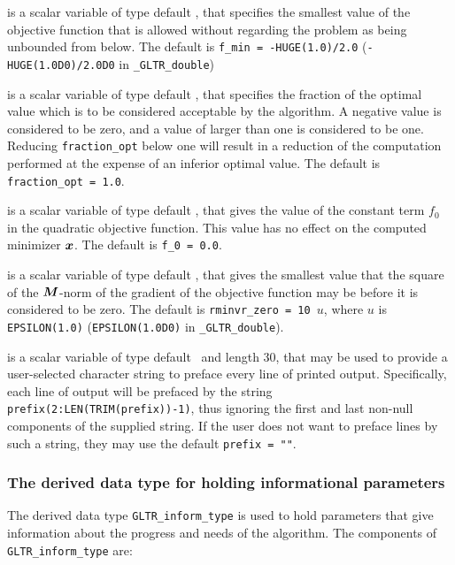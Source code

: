 \documentclass{galahad}
\newcommand{\packagename}{GL\-TR}
\newcommand{\fullpackagename}{\libraryname\_\packagename}
\begin{document}
\begin{description}
 is a scalar variable of type default
\realdp, that specifies the smallest value of the objective function
that is allowed without regarding the problem as being unbounded
from below. The default is {\tt f\_min = -HUGE(1.0)/2.0}
({\tt -HUGE(1.0D0)/2.0D0} in {\tt \fullpackagename\_double})

 is a scalar variable of type default
\realdp, that specifies the fraction
of the optimal value which is to be considered acceptable by the algorithm.
A negative value is considered to be zero, and a value of larger than one
is considered to be one. Reducing {\tt fraction\_opt} below one will result
in a reduction of the computation performed at the expense of an inferior
optimal value.
The default is {\tt fraction\_opt = 1.0}.

 is a scalar variable of type default
\realdp, that gives the value of the constant term $f_0$ in the
quadratic objective function. This value has no effect on the
computed minimizer ${\bm{x}}$. The default is {\tt f\_0 = 0.0}.

 is a scalar variable of type default
\realdp, that gives the smallest value that the square of the ${\bm{M}}$-norm of the
gradient of the objective function may be before it is considered to be zero.
The default is {\tt rminvr\_zero = 10 $u$},
where $u$ is {\tt EPSILON(1.0)} ({\tt EPSILON(1.0D0)} in
{\tt \fullpackagename\_double}).

 is a scalar variable of type default \character\
and length 30, that may be used to provide a user-selected
character string to preface every line of printed output.
Specifically, each line of output will be prefaced by the string
{\tt prefix(2:LEN(TRIM(prefix))-1)},
thus ignoring the first and last non-null components of the
supplied string. If the user does not want to preface lines by such
a string, they may use the default {\tt prefix = ""}.

\end{description}


\subsubsection{The derived data type for holding informational
 parameters}\label{typeinfo}
The derived data type
{\tt \packagename\_inform\_type}
is used to hold parameters that give information about the progress and needs
of the algorithm. The components of
{\tt \packagename\_inform\_type}
are:
\end{document}
